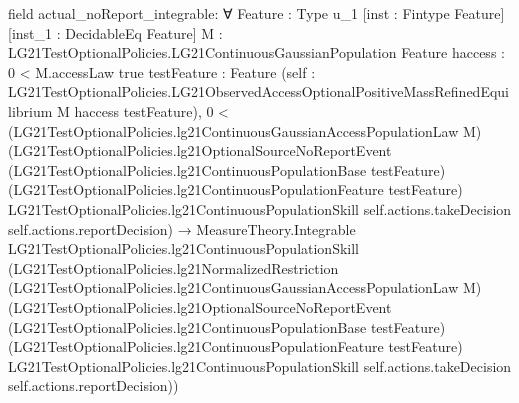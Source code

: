 \documentclass[10pt]{article}
\begin{document}
\begin{ReviewVerbatim}
field actual_noReport_integrable:
∀ {Feature : Type u_1} [inst : Fintype Feature] [inst_1 : DecidableEq Feature]
  {M : LG21TestOptionalPolicies.LG21ContinuousGaussianPopulation Feature} {haccess : 0 < M.accessLaw {true}}
  {testFeature : Feature}
  (self : LG21TestOptionalPolicies.LG21ObservedAccessOptionalPositiveMassRefinedEquilibrium M haccess testFeature),
  0 <
      (LG21TestOptionalPolicies.lg21ContinuousGaussianAccessPopulationLaw M)
        (LG21TestOptionalPolicies.lg21OptionalSourceNoReportEvent
          (LG21TestOptionalPolicies.lg21ContinuousPopulationBase testFeature)
          (LG21TestOptionalPolicies.lg21ContinuousPopulationFeature testFeature)
          LG21TestOptionalPolicies.lg21ContinuousPopulationSkill self.actions.takeDecision
          self.actions.reportDecision) →
    MeasureTheory.Integrable LG21TestOptionalPolicies.lg21ContinuousPopulationSkill
      (LG21TestOptionalPolicies.lg21NormalizedRestriction
        (LG21TestOptionalPolicies.lg21ContinuousGaussianAccessPopulationLaw M)
        (LG21TestOptionalPolicies.lg21OptionalSourceNoReportEvent
          (LG21TestOptionalPolicies.lg21ContinuousPopulationBase testFeature)
          (LG21TestOptionalPolicies.lg21ContinuousPopulationFeature testFeature)
          LG21TestOptionalPolicies.lg21ContinuousPopulationSkill self.actions.takeDecision self.actions.reportDecision))


\end{ReviewVerbatim}
\end{document}
